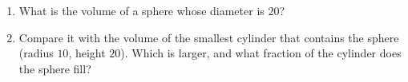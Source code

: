 \begin{enumerate}
\item[(a)] What is the volume of a sphere whose diameter is $20$?
\item[(b)] Compare it with the volume of the smallest cylinder that contains the sphere (radius $10$, height $20$). Which is larger, and what fraction of the cylinder does the sphere fill?
\end{enumerate}
